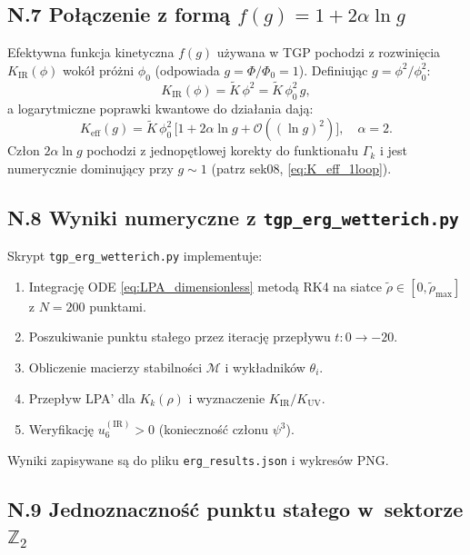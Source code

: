 \subsection*{N.7 Połączenie z formą $f(g) = 1 + 2\alpha\ln g$}

Efektywna funkcja kinetyczna $f(g)$ używana w TGP pochodzi z
rozwinięcia $K_\mathrm{IR}(\phi)$ wokół próżni $\phi_0$
(odpowiada $g = \Phi/\Phi_0 = 1$). Definiując $g = \phi^2/\phi_0^2$:
\begin{equation}
  K_\mathrm{IR}(\phi) = \tilde K\,\phi^2 = \tilde K\,\phi_0^2\,g,
\end{equation}
a logarytmiczne poprawki kwantowe do działania dają:
\begin{equation}
  K_\mathrm{eff}(g) = \tilde K\,\phi_0^2\,
    \bigl[1 + 2\alpha\ln g + \mathcal{O}((\ln g)^2)\bigr],
  \quad \alpha = 2.
\end{equation}
Człon $2\alpha\ln g$ pochodzi z jednopętlowej korekty do funktionału
$\Gamma_k$ i jest numerycznie dominujący przy $g \sim 1$
(patrz sek08, \eqref{eq:K_eff_1loop}).

\subsection*{N.8 Wyniki numeryczne z \texttt{tgp\_erg\_wetterich.py}}

Skrypt \texttt{tgp\_erg\_wetterich.py} implementuje:
\begin{enumerate}
  \item Integrację ODE \eqref{eq:LPA_dimensionless} metodą RK4 na siatce
        $\tilde\rho \in [0, \tilde\rho_\mathrm{max}]$ z $N = 200$ punktami.
  \item Poszukiwanie punktu stałego przez iterację przepływu $t: 0 \to -20$.
  \item Obliczenie macierzy stabilności $\mathcal{M}$ i wykładników $\theta_i$.
  \item Przepływ LPA' dla $K_k(\rho)$ i wyznaczenie $K_\mathrm{IR}/K_\mathrm{UV}$.
  \item Weryfikację $u_6^{(\mathrm{IR})} > 0$ (konieczność członu $\psi^3$).
\end{enumerate}

Wyniki zapisywane są do pliku \texttt{erg\_results.json} i wykresów PNG.

\subsection*{N.9 Jednoznaczno\'s\'c punktu sta\l{}ego w~sektorze $\mathbb{Z}_2$}

